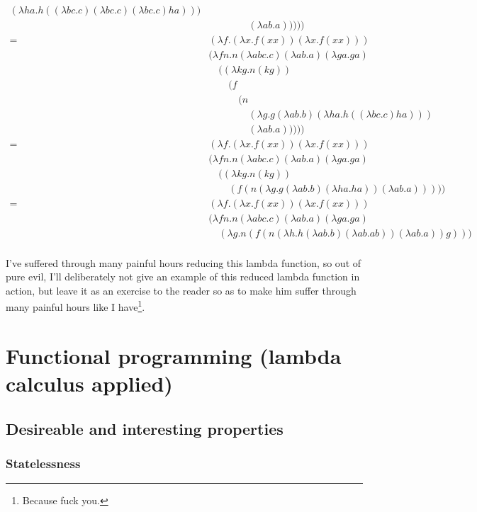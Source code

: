 \documentclass[11pt]{article}
\begin{document}
\begin{align*}
		(\lambda ha.h((\lambda bc.c)(\lambda bc.c)(\lambda bc.c)ha)))\\
	&\quad\quad\quad\quad(\lambda ab.a)))))\\
	=\ &(\lambda f.(\lambda x.f(xx))(\lambda x.f(xx)))\\
	&(\lambda fn.n(\lambda abc.c)(\lambda ab.a)(\lambda ga.ga)\\
	&\quad((\lambda kg.n(kg))\\
	&\quad\quad(f\\
	&\quad\quad\quad(n\\
	&\quad\quad\quad\quad(\lambda g.g(\lambda ab.b)(\lambda ha.h((\lambda bc.c)ha)))\\
	&\quad\quad\quad\quad(\lambda ab.a)))))\\
	=\ &(\lambda f.(\lambda x.f(xx))(\lambda x.f(xx)))\\
	&(\lambda fn.n(\lambda abc.c)(\lambda ab.a)(\lambda ga.ga)\\
	&\quad((\lambda kg.n(kg))\\
	&\quad\quad(f(n(\lambda g.g(\lambda ab.b)(\lambda ha.ha))(\lambda ab.a)))))\\
	=\ &(\lambda f.(\lambda x.f(xx))(\lambda x.f(xx)))\\
	&(\lambda fn.n(\lambda abc.c)(\lambda ab.a)(\lambda ga.ga)\\
	&\quad(\lambda g.n(f(n(\lambda h.h(\lambda ab.b)(\lambda ab.ab))(\lambda ab.a))g)))\\
\end{align*}
\endgroup

I've suffered through many painful hours reducing this lambda function, so out
of pure evil, I'll deliberately not give an example of this reduced lambda
function in action, but leave it as an exercise to the reader so as to make him
suffer through many painful hours like I have\footnote{Because fuck you.}.


\section{Functional programming (lambda calculus applied)}


\subsection{Desireable and interesting properties}

\subsubsection{Statelessness}
\end{document}
